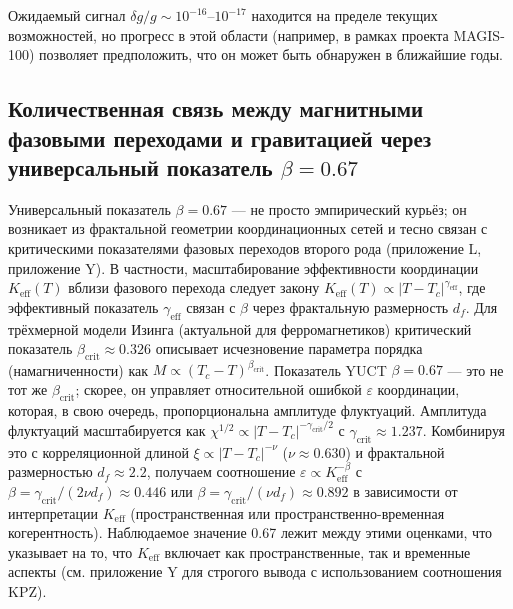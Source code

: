 \documentclass[12pt]{article}
\theoremstyle{remark}
\newcommand{\Keff}{K_{\mathrm{eff}}}
\begin{document}
	Ожидаемый сигнал $\delta g/g \sim 10^{-16}$–$10^{-17}$ находится на пределе текущих возможностей, но прогресс в этой области (например, в рамках проекта MAGIS-100) позволяет предположить, что он может быть обнаружен в ближайшие годы.
	
	\subsection{Количественная связь между магнитными фазовыми переходами и гравитацией через универсальный показатель \(\beta = 0.67\)}
	\label{subsec:magnetic-gravity-link}
	
	Универсальный показатель \(\beta = 0.67\) — не просто эмпирический курьёз; он возникает из фрактальной геометрии координационных сетей и тесно связан с критическими показателями фазовых переходов второго рода (приложение L, приложение Y). В частности, масштабирование эффективности координации \(\Keff(T)\) вблизи фазового перехода следует закону \(\Keff(T) \propto |T - T_c|^{\gamma_{\mathrm{eff}}}\), где эффективный показатель \(\gamma_{\mathrm{eff}}\) связан с \(\beta\) через фрактальную размерность \(d_f\). Для трёхмерной модели Изинга (актуальной для ферромагнетиков) критический показатель \(\beta_{\mathrm{crit}} \approx 0.326\) описывает исчезновение параметра порядка (намагниченности) как \(M \propto (T_c - T)^{\beta_{\mathrm{crit}}}\). Показатель YUCT \(\beta = 0.67\) — это не тот же \(\beta_{\mathrm{crit}}\); скорее, он управляет относительной ошибкой \(\varepsilon\) координации, которая, в свою очередь, пропорциональна амплитуде флуктуаций. Амплитуда флуктуаций масштабируется как \(\chi^{1/2} \propto |T - T_c|^{-\gamma_{\mathrm{crit}}/2}\) с \(\gamma_{\mathrm{crit}} \approx 1.237\). Комбинируя это с корреляционной длиной \(\xi \propto |T - T_c|^{-\nu}\) (\(\nu \approx 0.630\)) и фрактальной размерностью \(d_f \approx 2.2\), получаем соотношение \(\varepsilon \propto \Keff^{-\beta}\) с \(\beta = \gamma_{\mathrm{crit}}/(2\nu d_f) \approx 0.446\) или \(\beta = \gamma_{\mathrm{crit}}/(\nu d_f) \approx 0.892\) в зависимости от интерпретации \(\Keff\) (пространственная или пространственно-временная когерентность). Наблюдаемое значение 0.67 лежит между этими оценками, что указывает на то, что \(\Keff\) включает как пространственные, так и временные аспекты (см. приложение Y для строгого вывода с использованием соотношения KPZ).
	
\end{document}
